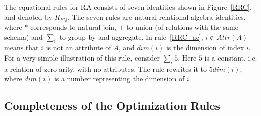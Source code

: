 The equational rules for RA consists of seven identities shown in
Figure~\ref{RRC}, and denoted by $R_{EQ}$.  The seven rules are
natural relational algebra identities, where $*$ corresponds to
natural join, $+$ to union (of relations with the same schema) and
$\sum_i$ to group-by and aggregate.  In rule~\ref{RRC_ac},
$i \notin Attr(A)$ means that $i$ is not an attribute of $A$, and
$dim(i)$ is the dimension of index $i$.  For a very simple
illustration of this rule, consider $\sum_i 5$.  Here $5$ is a
constant, i.e. a relation of zero arity, with no attributes.  The rule
rewrites it to $5 dim(i)$, where $dim(i)$ is a number representing the
dimension of $i$.



\subsection{Completeness of the Optimization Rules}\label{ranf}

